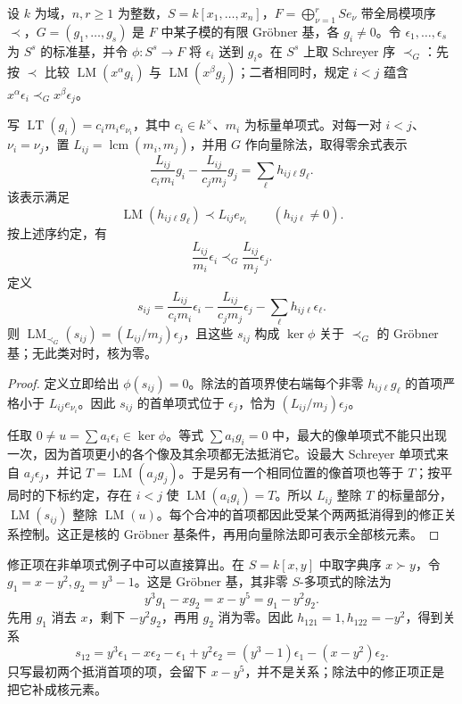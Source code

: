 \begin{theorem}[Schreyer]\label{b3:thm:schreyer-syzygies}
	设 \(k\) 为域，\(n,r\ge1\) 为整数，\(S=k[x_1,\ldots,x_n]\)，\(F=\bigoplus_{\nu=1}^rSe_\nu\) 带全局模项序 \(\prec\)，\(G=(g_1,\ldots,g_s)\) 是 \(F\) 中某子模的有限 Gröbner 基，各 \(g_i\ne0\)。令 \(\epsilon_1,\ldots,\epsilon_s\) 为 \(S^s\) 的标准基，并令 \(\phi:S^s\rightarrow F\) 将 \(\epsilon_i\) 送到 \(g_i\)。在 \(S^s\) 上取 Schreyer 序 \(\prec_G\)：先按 \(\prec\) 比较 \(\operatorname{LM}(x^\alpha g_i)\) 与 \(\operatorname{LM}(x^\beta g_j)\)；二者相同时，规定 \(i<j\) 蕴含 \(x^\alpha\epsilon_i\prec_G x^\beta\epsilon_j\)。

	写 \(\operatorname{LT}(g_i)=c_im_ie_{\nu_i}\)，其中 \(c_i\in k^\times\)、\(m_i\) 为标量单项式。对每一对 \(i<j\)、\(\nu_i=\nu_j\)，置 \(L_{ij}=\operatorname{lcm}(m_i,m_j)\)，并用 \(G\) 作向量除法，取得零余式表示
	\[
		\frac{L_{ij}}{c_im_i}g_i -\frac{L_{ij}}{c_jm_j}g_j =\sum_\ell h_{ij\ell}g_\ell.
	\]
	该表示满足
	\[
		\operatorname{LM}(h_{ij\ell}g_\ell) \prec L_{ij}e_{\nu_i} \qquad(h_{ij\ell}\ne0).
	\]
	按上述序约定，有
	\[
		\frac{L_{ij}}{m_i}\epsilon_i \prec_G\frac{L_{ij}}{m_j}\epsilon_j.
	\]
	定义
	\[
		s_{ij}=\frac{L_{ij}}{c_im_i}\epsilon_i -\frac{L_{ij}}{c_jm_j}\epsilon_j -\sum_\ell h_{ij\ell}\epsilon_\ell.
	\]
	则 \(\operatorname{LM}_{\prec_G}(s_{ij})=(L_{ij}/m_j)\epsilon_j\)，且这些 \(s_{ij}\) 构成 \(\ker\phi\) 关于 \(\prec_G\) 的 Gröbner 基；无此类对时，核为零。
\end{theorem}
\begin{proof}
	定义立即给出 \(\phi(s_{ij})=0\)。除法的首项界使右端每个非零 \(h_{ij\ell}g_\ell\) 的首项严格小于 \(L_{ij}e_{\nu_i}\)。因此 \(s_{ij}\) 的首单项式位于 \(\epsilon_j\)，恰为 \((L_{ij}/m_j)\epsilon_j\)。

	任取 \(0\ne u=\sum a_i\epsilon_i\in\ker\phi\)。等式 \(\sum a_ig_i=0\) 中，最大的像单项式不能只出现一次，因为首项更小的各个像及其余项都无法抵消它。设最大 Schreyer 单项式来自 \(a_j\epsilon_j\)，并记 \(T=\operatorname{LM}(a_jg_j)\)。于是另有一个相同位置的像首项也等于 \(T\)；按平局时的下标约定，存在 \(i<j\) 使 \(\operatorname{LM}(a_ig_i)=T\)。所以 \(L_{ij}\) 整除 \(T\) 的标量部分，\(\operatorname{LM}(s_{ij})\) 整除 \(\operatorname{LM}(u)\)。每个合冲的首项都因此受某个两两抵消得到的修正关系控制。这正是核的 Gröbner 基条件，再用向量除法即可表示全部核元素。
\end{proof}

修正项在非单项式例子中可以直接算出。在 \(S=k[x,y]\) 中取字典序 \(x\succ y\)，令 \(g_1=x-y^2,g_2=y^3-1\)。这是 Gröbner 基，其非零 \(S\)-多项式的除法为
\[
	y^3g_1-xg_2=x-y^5=g_1-y^2g_2.
\]
先用 \(g_1\) 消去 \(x\)，剩下 \(-y^2g_2\)，再用 \(g_2\) 消为零。因此 \(h_{121}=1,h_{122}=-y^2\)，得到关系
\[
	s_{12}=y^3\epsilon_1-x\epsilon_2-\epsilon_1+y^2\epsilon_2 =(y^3-1)\epsilon_1-(x-y^2)\epsilon_2.
\]
只写最初两个抵消首项的项，会留下 \(x-y^5\)，并不是关系；除法中的修正项正是把它补成核元素。

